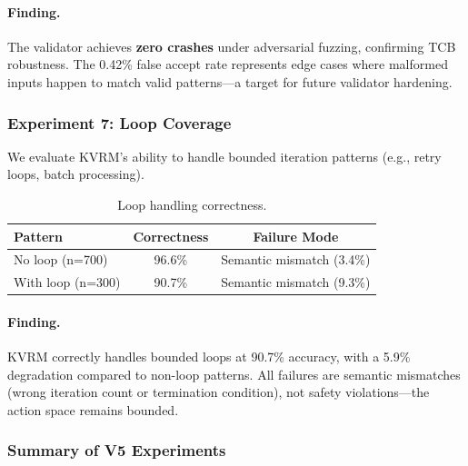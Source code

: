 \documentclass[11pt]{article}
\begin{document}
\paragraph{Finding.} The validator achieves \textbf{zero crashes} under adversarial fuzzing, confirming TCB robustness. The 0.42\% false accept rate represents edge cases where malformed inputs happen to match valid patterns---a target for future validator hardening.

\subsubsection{Experiment 7: Loop Coverage}

We evaluate KVRM's ability to handle bounded iteration patterns (e.g., retry loops, batch processing).

\begin{table}[h]
\centering
\caption{Loop handling correctness.}
\label{tab:exp7_loops}
\begin{tabular}{lcc}
\toprule
Pattern & Correctness & Failure Mode \\
\midrule
No loop (n=700) & 96.6\% & Semantic mismatch (3.4\%) \\
With loop (n=300) & 90.7\% & Semantic mismatch (9.3\%) \\
\bottomrule
\end{tabular}
\end{table}

\paragraph{Finding.} KVRM correctly handles bounded loops at 90.7\% accuracy, with a 5.9\% degradation compared to non-loop patterns. All failures are semantic mismatches (wrong iteration count or termination condition), not safety violations---the action space remains bounded.

\subsubsection{Summary of V5 Experiments}
\end{document}
